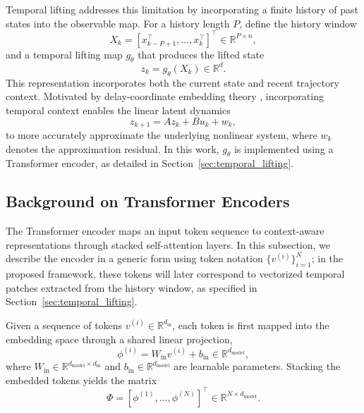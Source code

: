 \documentclass[journal]{IEEEtran}
\begin{document}
Temporal lifting addresses this limitation by incorporating a finite history of past states into the observable map. For a history length $P$, define the history window
\begin{equation}
    X_k = [x_{k-P+1}^\top, \ldots, x_k^\top]^\top \in \mathbb{R}^{P\times n},
    \label{eq:history_window}
\end{equation}
and a temporal lifting map $g_\theta$ that produces the lifted state
\begin{equation}
    z_k = g_\theta(X_k) \in \mathbb{R}^d.
    \label{eq:temporal_lifting}
\end{equation}
This representation incorporates both the current state and recent trajectory context. Motivated by delay-coordinate embedding theory \cite{arbabi2017ergodic, rank2019recurrent}, incorporating temporal context enables the linear latent dynamics
\begin{equation}
    z_{k+1} = A z_k + B u_k + w_k,
    \label{eq:lifted_dynamics_prelim}
\end{equation}
to more accurately approximate the underlying nonlinear system, where $w_k$ denotes the approximation residual. In this work, $g_\theta$ is implemented using a Transformer encoder, as detailed in Section~\ref{sec:temporal_lifting}.

\subsection{Background on Transformer Encoders}
\label{sec:transformer_background}

The Transformer encoder \cite{vaswani2017attention} maps an input token sequence to context-aware representations through stacked self-attention layers. In this subsection, we describe the encoder in a generic form using token notation $\{v^{(i)}\}_{i=1}^{N}$; in the proposed framework, these tokens will later correspond to vectorized temporal patches extracted from the history window, as specified in Section~\ref{sec:temporal_lifting}.

Given a sequence of tokens $v^{(i)} \in \mathbb{R}^{d_{\mathrm{in}}}$, each token is first mapped into the embedding space through a shared linear projection,
\begin{equation}
    \phi^{(i)} = W_{\mathrm{in}} v^{(i)} + b_{\mathrm{in}}
    \in \mathbb{R}^{d_{\mathrm{model}}},
    \label{eq:general_embed}
\end{equation}
where $W_{\mathrm{in}} \in \mathbb{R}^{d_{\mathrm{model}} \times d_{\mathrm{in}}}$ and $b_{\mathrm{in}} \in \mathbb{R}^{d_{\mathrm{model}}}$ are learnable parameters. Stacking the embedded tokens yields the matrix
\begin{equation}
    \Phi = [\phi^{(1)}, \ldots, \phi^{(N)}]^\top
    \in \mathbb{R}^{N \times d_{\mathrm{model}}}.
\end{equation}
\end{document}
